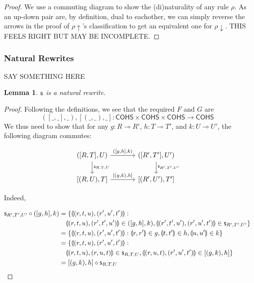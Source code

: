 \documentclass[11pt, oneside]{article}
\theoremstyle{plain}
\newtheorem{lemma}[theorem]{Lemma}
\theoremstyle{definition}
\newcommand{\lp}{\llparenthesis}
\newcommand{\rp}{\rrparenthesis}
\newcommand{\cohs}{{\mathsf{COHS}}}
\newcommand{\comp}{\mathbin{\circ}}
\begin{document}
\begin{proof}
We use a commuting diagram to show the (di)naturality of any rule $\rho$.
As an up-down pair are, by definition, dual to eachother, we can simply reverse the arrows in the proof of ${\mathsf{\rho}}{\uparrow}$'s classification to get an equivalent one for ${\mathsf{\rho}}{\downarrow}$.
THIS FEELS RIGHT BUT MAY BE INCOMPLETE.
\end{proof}

\subsubsection{Natural Rewrites}
SAY SOMETHING HERE

\begin{lemma}
${\mathsf s}$ is a natural rewrite.
\end{lemma}

\begin{proof}
Following the definitions, we see that the required $F$ and $G$ are
$$([\_,\_],\_),[(\_,\_),\_]:\cohs\times\cohs\times\cohs\to\cohs$$
We thus need to show that for any $g:R\multimap R'$, $h:T\multimap T'$, and $k:U\multimap U'$, the following diagram commutes:

\[
\begin{tikzcd}[column sep = large]
    ([R,T],U) \arrow[r,"{([g,h],k)}"]\arrow[d,"\sw_{R,T,U}"]& ([R',T'],U') \arrow[d,"\sw_{R',T',U'}"] \\
    {[(R,U),T]} \arrow[r,"{[(g,k),h]}"] & {[(R',U'),T']}
\end{tikzcd}
\]

Indeed,

\begin{align*}
\sw_{R',T',U'}\comp ([g,h],k) &= \{\lp(r,t,u),(r',u',t')\rp: \\
&\quad\lp(r,t,u),(r',t',u')\rp\in([g,h],k),\lp(r',t',u'),(r',u',t')\rp\in \sw_{R',T',U'}\} \\
&= \{\lp(r,t,u),(r',u',t')\rp:\lp r,r'\rp\in g, \lp t,t'\rp\in h, \lp u,u'\rp\in k\} \\
&= \{\lp(r,t,u),(r',u',t')\rp: \\
&\quad\lp(r,t,u),(r,u,t)\rp\in \sw_{R,T,U},\lp(r,u,t),(r',u',t')\rp\in[(g,k),h]\} \\
&= [(g,k),h]\comp \sw_{R,T,U}
\end{align*}
\end{proof}
\end{document}
